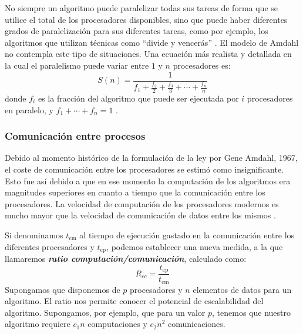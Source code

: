 No siempre un algoritmo puede paralelizar todas sus tareas de forma que se utilice el total de los procesadores 
disponibles, sino que puede haber diferentes grados de paralelización para sus diferentes tareas, como por ejemplo, los
algoritmos que utilizan técnicas como ``divide y vencerás'' \cite{SUN199327}. El modelo de Amdahl
no contempla este tipo de situaciones. Una ecuación más realista y detallada en la cual el paralelismo puede variar 
entre $1$ y $n$ procesadores es:
\begin{equation}
    S(n)=\frac{1}{f_1+\displaystyle\frac{f_2}2+\displaystyle\frac{f_3}3+\cdots+\displaystyle\frac{f_n}n}
\end{equation}
donde $f_i$ es la fracción del algoritmo que puede ser ejecutada por $i$ procesadores en paralelo, y $f_1+\cdots+f_n=1$
\cite{Gustafson2011}.

\subsubsection*{Comunicación entre procesos}

\vspace{10pt}
Debido al momento histórico de la formulación de la ley por Gene Amdahl, 1967, el coste de comunicación entre los
procesadores se estimó como insignificante. Esto fue así debido a que en ese momento la computación de los algoritmos
era magnitudes superiores en cuanto a tiempo que la comunicación entre los procesadores. La velocidad de computación
de los procesadores modernos es mucho mayor que la velocidad de comunicación de datos entre los mismos
\cite{Gustafson2011}.

\vspace{10pt}
Si denominamos $t_{\text{cm}}$ al tiempo de ejecución gastado en la comunicación entre los diferentes procesadores
y $t_{\text{cp}}$, podemos establecer una nueva medida, a la que llamaremos 
\textbf{\textit{ratio computación/comunicación}}, calculado como:
\begin{equation}
    R_{cc}=\frac{t_{\text{cp}}}{t_{\text{cm}}}
\end{equation}
Supongamos que disponemos de $p$ procesadores y $n$ elementos de datos para un algoritmo. El ratio nos permite conocer
el potencial de escalabilidad del algoritmo. Supongamos, por ejemplo, que para un valor $p$, tenemos que nuestro
algoritmo requiere $c_1n$ computaciones y $c_2n^2$ comunicaciones. 

